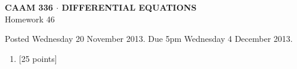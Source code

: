 \documentclass[10pt]{article}
\begin{document}
\vspace*{-5em}
\begin{center}
\large \textsf{\textbf{CAAM 336 $\cdot$ DIFFERENTIAL EQUATIONS}\\[0.5em]
Homework 46 }
\end{center}

Posted Wednesday 20 November 2013.  Due 5pm Wednesday 4 December 2013.

\begin{enumerate}\addtocounter{enumi}{45}
\item {[25 points]}  
\end{enumerate}
\end{document}
